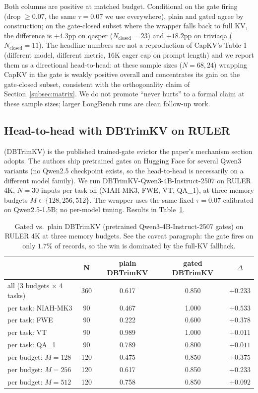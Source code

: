 \documentclass{article}
\begin{document}
Both columns are positive at matched budget. Conditional on the gate
firing (drop $\geq 0.07$, the same $\tau = 0.07$ we use everywhere),
plain and gated agree by construction; on the gate-closed subset where
the wrapper falls back to full KV, the difference is $+4.3$pp on qasper
($N_{\text{closed}} = 23$) and $+18.2$pp on triviaqa
($N_{\text{closed}} = 11$). The headline numbers are not a reproduction
of CapKV's Table 1 (different model, different metric, 16K eager cap on
prompt length) and we report them as a directional head-to-head: at
these sample sizes ($N = 68, 24$) wrapping CapKV in the gate is
weakly positive overall and concentrates its gain on the gate-closed
subset, consistent with the orthogonality claim of
Section~\ref{subsec:matrix}. We do not promote ``never hurts'' to a
formal claim at these sample sizes; larger LongBench runs are clean
follow-up work.

\subsection{Head-to-head with DBTrimKV on RULER}
\label{subsec:dbtrimkv}

\citet{arxiv260509649} (DBTrimKV) is the published trained-gate evictor
the paper's mechanism section adopts. The authors ship pretrained gates
on Hugging Face for several Qwen3 variants (no Qwen2.5 checkpoint
exists, so the head-to-head is necessarily on a different model
family). We run DBTrimKV-Qwen3-4B-Instruct-2507 on RULER 4K, $N = 30$
inputs per task on (NIAH-MK3, FWE, VT, QA\_1), at three memory budgets
$M \in \{128, 256, 512\}$. The wrapper uses the same fixed
$\tau = 0.07$ calibrated on Qwen2.5-1.5B; no per-model tuning.
Results in Table~\ref{tab:dbtrimkv}.

\begin{table}[h]
\centering
\caption{Gated vs.\ plain DBTrimKV (pretrained Qwen3-4B-Instruct-2507
gates) on RULER 4K at three memory budgets. See the caveat paragraph:
the gate fires on only $1.7\%$ of records, so the win is dominated by
the full-KV fallback.}
\label{tab:dbtrimkv}
\begin{tabular}{lcccc}
\toprule
 & N & plain DBTrimKV & gated DBTrimKV & $\Delta$ \\
\midrule
all (3 budgets $\times$ 4 tasks) & 360 & 0.617 & 0.850 & $\boldsymbol{+0.233}$ \\
\midrule
per task: NIAH-MK3 & 90 & 0.467 & 1.000 & $+0.533$ \\
per task: FWE      & 90 & 0.222 & 0.600 & $+0.378$ \\
per task: VT       & 90 & 0.989 & 1.000 & $+0.011$ \\
per task: QA\_1    & 90 & 0.789 & 0.800 & $+0.011$ \\
\midrule
per budget: $M=128$ & 120 & 0.475 & 0.850 & $+0.375$ \\
per budget: $M=256$ & 120 & 0.617 & 0.850 & $+0.233$ \\
per budget: $M=512$ & 120 & 0.758 & 0.850 & $+0.092$ \\
\bottomrule
\end{tabular}
\end{table}
\end{document}
